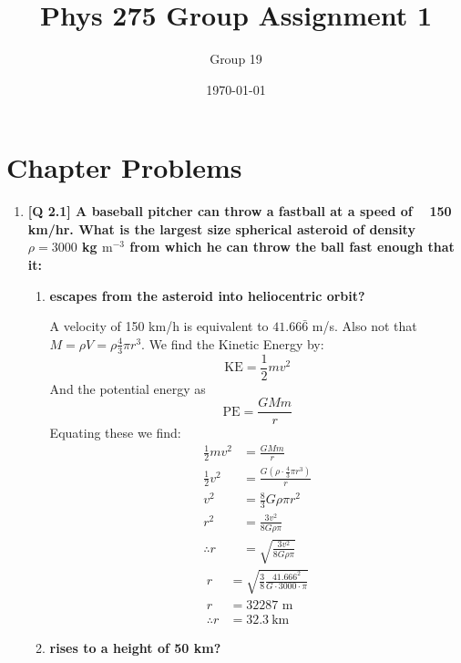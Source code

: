 \documentclass[10pt]{article}
\begin{document}
	\title{\textbf{Phys 275 Group Assignment 1}}
	\date{\today}
	\author{Group 19}
	\maketitle
	\section{Chapter Problems}
	\begin{enumerate}
		\item  \textbf{[Q 2.1] A baseball pitcher can throw a fastball at a speed of ~ 150 km/hr. What is the largest size spherical asteroid of density $\rho = 3000$ kg $\text{m}^{-3}$ from which he can throw the ball fast enough that it:} 
		\begin{enumerate}
			\item  \textbf{escapes from the asteroid into heliocentric orbit?}
			
			A velocity of 150 km/h is equivalent to $41.66\bar{6}$ m/s. Also not that $M = \rho V = \rho \frac{4}{3} \pi r^3$. We find the Kinetic Energy by:
			\[ \text{KE} = \frac{1}{2} mv^2 \]
			And the potential energy as 
			\[ \text{PE} = \frac{GMm}{r} \]
			Equating these we find:
			\begin{align*}
				\frac{1}{2} mv^2 &= \frac{GMm}{r} \\
				\frac{1}{2} v^2 &= \frac{G \left( \rho \cdot \frac{4}{3} \pi r^3 \right)}{r} \\
				v^2 &=  \frac{8}{3} G \rho \pi r^2 \\
				r^2 &= \frac{3 v^2}{8 G \rho \pi} \\
				\therefore r &= \sqrt{\frac{3 v^2}{8 G \rho \pi}} 
			\end{align*}
			\begin{align*}
				r &= \sqrt{\frac{3}{8}\frac{41.666^2}{G \cdot 3000 \cdot \pi}} \\
				r &= 32 287 \text{ m} \\
				\therefore r &= 32.3 \ \text{km}
			\end{align*}
			\item  \textbf{rises to a height of 50 km?}


\end{enumerate}
\end{enumerate}
\end{document}
